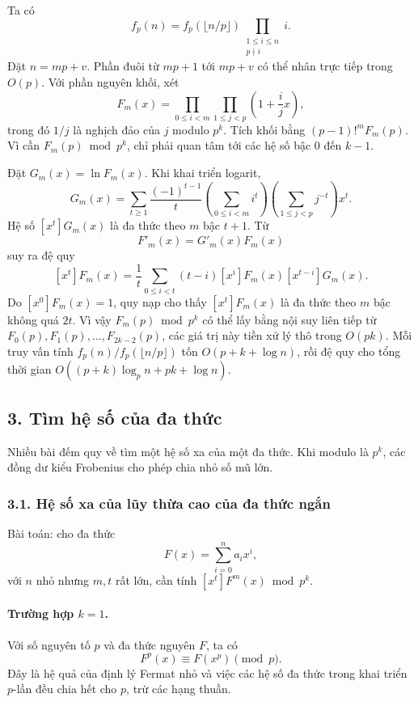 \documentclass[11pt]{article}
\begin{document}
Ta có
\[
  f_p(n)=f_p(\lfloor n/p\rfloor)\prod_{\substack{1\le i\le n\\p\nmid i}} i.
\]
Đặt \(n=mp+v\). Phần đuôi từ \(mp+1\) tới \(mp+v\) có thể nhân trực tiếp trong
\(O(p)\). Với phần nguyên khối, xét
\[
  F_m(x)=\prod_{0\le i<m}\prod_{1\le j<p}\left(1+\frac ij x\right),
\]
trong đó \(1/j\) là nghịch đảo của \(j\) modulo \(p^k\). Tích khối bằng
\((p-1)!^mF_m(p)\). Vì cần \(F_m(p)\bmod p^k\), chỉ phải quan tâm tới các hệ số
bậc \(0\) đến \(k-1\).

Đặt \(G_m(x)=\ln F_m(x)\). Khi khai triển logarit,
\[
  G_m(x)=\sum_{t\ge 1}\frac{(-1)^{t-1}}t
  \left(\sum_{0\le i<m} i^t\right)
  \left(\sum_{1\le j<p} j^{-t}\right)x^t.
\]
Hệ số \([x^t]G_m(x)\) là đa thức theo \(m\) bậc \(t+1\). Từ
\[
  F'_m(x)=G'_m(x)F_m(x)
\]
suy ra đệ quy
\[
  [x^t]F_m(x)=\frac1t\sum_{0\le i<t}
  (t-i)[x^i]F_m(x)[x^{t-i}]G_m(x).
\]
Do \([x^0]F_m(x)=1\), quy nạp cho thấy \([x^t]F_m(x)\) là đa thức theo \(m\)
bậc không quá \(2t\). Vì vậy \(F_m(p)\bmod p^k\) có thể lấy bằng nội suy liên
tiếp từ \(F_0(p),F_1(p),\ldots,F_{2k-2}(p)\), các giá trị này tiền xử lý thô
trong \(O(pk)\). Mỗi truy vấn tính \(f_p(n)/f_p(\lfloor n/p\rfloor)\) tốn
\(O(p+k+\log n)\), rồi đệ quy cho tổng thời gian
\(O((p+k)\log_p n+pk+\log n)\).

\subsection*{3. Tìm hệ số của đa thức}

Nhiều bài đếm quy về tìm một hệ số xa của một đa thức. Khi modulo là \(p^k\),
các đồng dư kiểu Frobenius cho phép chia nhỏ số mũ lớn.

\subsubsection*{3.1. Hệ số xa của lũy thừa cao của đa thức ngắn}

Bài toán: cho đa thức
\[
  F(x)=\sum_{i=0}^n a_ix^i,
\]
với \(n\) nhỏ nhưng \(m,t\) rất lớn, cần tính \([x^t]F^m(x)\bmod p^k\).

\paragraph{Trường hợp \(k=1\).}
Với số nguyên tố \(p\) và đa thức nguyên \(F\), ta có
\[
  F^p(x)\equiv F(x^p)\pmod p.
\]
Đây là hệ quả của định lý Fermat nhỏ và việc các hệ số đa thức trong khai triển
\(p\)-lần đều chia hết cho \(p\), trừ các hạng thuần.
\end{document}
